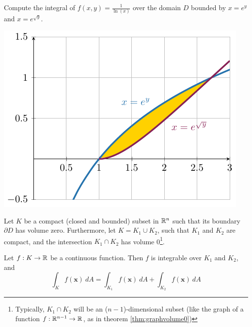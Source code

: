     \begin{example}
        Compute the integral of $f(x,y) = \frac{1}{\ln(x)}$ over the domain $D$ bounded by $x = e^y$ and $x= e^{\sqrt{y}}$.

    \begin{center}
        \includegraphics{chapters/4-IntegrationRn/figures/figures-intersectfubini.pdf}
    \end{center}
        
    \end{example}

\begin{theorem}
        Let $K$ be a compact (closed and bounded) subset in $\mathbb{R}^n$ such that its boundary $\partial D$ has volume zero.  Furthermore, let $K = K_1 \cup K_2$, such that $K_1$ and $K_2$ are compact, and the intersection $K_1 \cap K_2$ has volume 0\footnote{Typically, $K_1 \cap K_2$ will be an ($n-1$)-dimensional subset (like the graph of a function $f : \mathbb{R}^{n-1} \to \mathbb{R}$, as in theorem \ref{thm:graphvolume0})}. 
    
    
    Let $f : K \to \mathbb{R}$ be a continuous function.  Then $f$ is integrable over $K_1$ and $K_2$, and 
    $$\int_K f(\bm{x}) \ dA = \int_{K_1} f(\bm{x}) \ dA + \int_{K_2} f(\bm{x}) \ dA $$ 
    \end{theorem}

